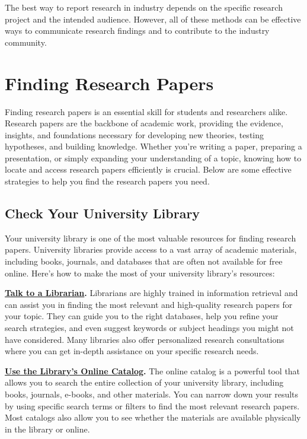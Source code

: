 \documentclass[
]{book}
\begin{document}
The best way to report research in industry depends on the specific research project and the intended audience. However, all of these methods can be effective ways to communicate research findings and to contribute to the industry community.

\section{Finding Research Papers}\label{finding-research-papers}

Finding research papers is an essential skill for students and researchers alike. Research papers are the backbone of academic work, providing the evidence, insights, and foundations necessary for developing new theories, testing hypotheses, and building knowledge. Whether you're writing a paper, preparing a presentation, or simply expanding your understanding of a topic, knowing how to locate and access research papers efficiently is crucial. Below are some effective strategies to help you find the research papers you need.

\subsection*{Check Your University Library}\label{check-your-university-library}

Your university library is one of the most valuable resources for finding research papers. University libraries provide access to a vast array of academic materials, including books, journals, and databases that are often not available for free online. Here's how to make the most of your university library's resources:

\href{https://www.siue.edu/lovejoy-library/ask-a-librarian/}{\textbf{Talk to a Librarian}}\textbf{.} Librarians are highly trained in information retrieval and can assist you in finding the most relevant and high-quality research papers for your topic. They can guide you to the right databases, help you refine your search strategies, and even suggest keywords or subject headings you might not have considered. Many libraries also offer personalized research consultations where you can get in-depth assistance on your specific research needs.

\href{https://i-share-sie.primo.exlibrisgroup.com/discovery/search?vid=01CARLI_SIE:CARLI_SIE&lang=en}{\textbf{Use the Library's Online Catalog}}\textbf{.} The online catalog is a powerful tool that allows you to search the entire collection of your university library, including books, journals, e-books, and other materials. You can narrow down your results by using specific search terms or filters to find the most relevant research papers. Most catalogs also allow you to see whether the materials are available physically in the library or online.
\end{document}

